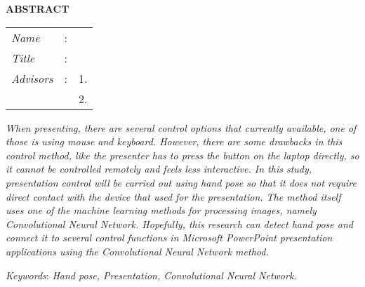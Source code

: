 \begin{center}
  \large\textbf{ABSTRACT}
\end{center}


\vspace{2ex}

\begingroup
\setlength{\tabcolsep}{0pt}

\noindent
\begin{tabularx}{\textwidth}{l >{\centering}m{3em} X}
  \emph{Name}     & : & \name{}         \\

  \emph{Title}    & : & \engtatitle{}   \\

  \emph{Advisors} & : & 1. \advisor{}   \\
                  &   & 2. \coadvisor{} \\
\end{tabularx}
\endgroup

\emph{When presenting, there are several control options that currently available, one of those is using mouse and keyboard. However, there are some drawbacks in this control method, like the presenter has to press the button on the laptop directly, so it cannot be controlled remotely and feels less interactive. In this study, presentation control will be carried out using hand pose so that it does not require direct contact with the device that used for the presentation. The method itself uses one of the machine learning methods for processing images, namely Convolutional Neural Network. Hopefully, this research can detect hand pose and connect it to several control functions in Microsoft PowerPoint presentation applications using the Convolutional Neural Network method.}

\emph{Keywords}: \emph{Hand pose, Presentation, Convolutional Neural Network}.
